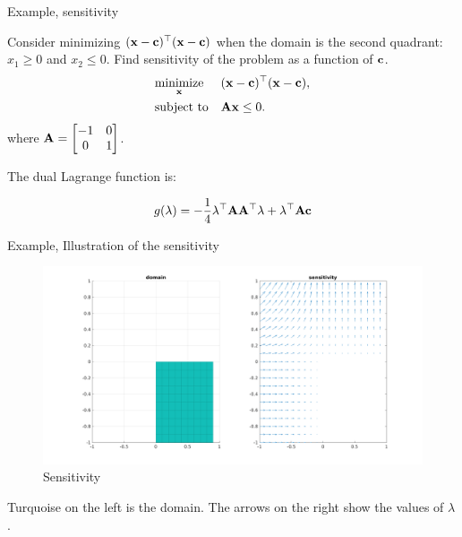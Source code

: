\documentclass{beamer}
\begin{document}
\begin{frame}{Example, sensitivity}
	\begin{flushleft}
		
	
		Consider minimizing $(\mathbf{x} - \mathbf{c})^\top (\mathbf{x} - \mathbf{c})$ when the domain is the second quadrant: $x_1 \geq 0$ and $x_2 \leq 0$. Find sensitivity of the problem as a function of $\mathbf{c}$.
		\begin{equation}
			\begin{aligned}
				& \underset{\mathbf{x}}{\text{minimize}}
				& & (\mathbf{x} - \mathbf{c})^\top (\mathbf{x} - \mathbf{c}), \\
				& \text{subject to}
				& & \mathbf{A}\mathbf{x} \leq 0.
			\end{aligned}
		\end{equation}
	where $\mathbf{A} = \begin{bmatrix}
		-1 & 0 \\ 0 & 1
	\end{bmatrix}$.
		
		The dual Lagrange function is:
		
		\begin{equation}
			g(\lambda) = -\frac{1}{4} \lambda^\top \mathbf{A}\mathbf{A}^\top\lambda + \lambda^\top \mathbf{A}\mathbf{c}
		\end{equation}
		
		
	\end{flushleft}
\end{frame}



\begin{frame}{Example, Illustration of the sensitivity}
	\begin{flushleft}
		
		\begin{figure}
			\centering
			\includegraphics[width=\linewidth]{sensitivity.png}
			\caption{Sensitivity}
			\label{fig:Sensitivity}
		\end{figure}
		
		Turquoise on the left is the domain. The arrows on the right show the values of $\lambda$.
		
	\end{flushleft}
\end{frame}
\end{document}
